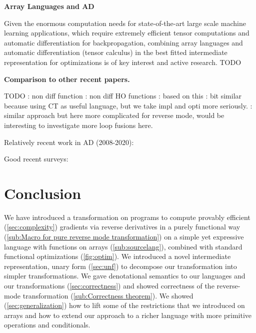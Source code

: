 \noindent \textbf{Array Languages and AD}

Given the enormous computation needs for state-of-the-art large scale machine learning applications, 
which require extremely efficient tensor computations and automatic differentiation for backpropagation, 
combining array languages and automatic differentiation (tensor calculus) in the best 
fitted intermediate representation for optimizations is of key interest and active research.
\cite{bernstein2020differentiating} 
TODO
\cite{laue2018computing,laue2020simple}

\noindent \textbf{Comparison to other recent papers.}

TODO
\cite{ee2020correctness}: non diff function
\cite{sherman2021}: non diff HO functions
\cite{pearlmutter2008reverse}: based on this
\cite{elliott2018simple}: bit similar because using CT as useful language, but we take impl and opti more seriously.
\cite{shaikhha2019efficient}: similar approach but here more complicated for reverse mode, would be interesting to investigate more loop fusions here.

Relatively recent work in AD (2008-2020):
\cite{mak2020differential,elliotthigher,vytiniotis2019differentiable,innes2018don,baydin2017automatic,huot2020correctness,gallagher-sdg,manzyuk2012confusion,wang2018demystifying,beck1994if,wang2018backpropagation,betancourt2018geometric,elliott2018simple,carpenter2015stan,paszke2017automatic,shaikhha2019efficient,innes2019zygote,griewank2008evaluating,kucukelbir2017automatic,brunel2019backpropagation,barthe2020versatility,abadi2019simple,cockett2019reverse,van2018automatic,hascoet2013tapenade,abadi2016tensorflow,pearlmutter2008reverse,bergstra2010theano,fong2019backprop,ehrhard2003differential,agrawal2019tensorflow,bettencourt2019taylor,cruttwell2017cartesian,manzyuk2012simply,laue2018computing,bernstein2020differentiating}

Good recent surveys: \cite{van2018automatic,baydin2017automatic}

\section{Conclusion}
\label{sec:conclusion}

We have introduced a transformation on programs to compute provably efficient (\ref{sec:complexity}) 
gradients via reverse derivatives in a purely functional way (\ref{sub:Macro for pure reverse mode transformation})
on a simple yet expressive language with functions on arrays (\ref{sub:sourcelang}), 
combined with standard functional optimizations (\ref{fig:optim}).  
We introduced a novel intermediate representation, unary form (\ref{sec:unf}) 
to decompose our transformation into simpler transformations.
We gave denotational semantics to our languages and our transformations (\ref{sec:correctness}) 
and showed correctness of the reverse-mode transformation (\ref{sub:Correctness theorem}).
We showed (\ref{sec:generalization}) how to lift some of the restrictions that
we introduced on arrays and how to extend our approach to a richer language with more primitive operations and conditionals.
\clearpage